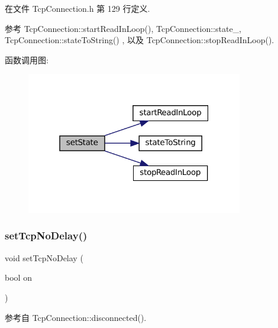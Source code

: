 在文件 Tcp\+Connection.\+h 第 129 行定义.



参考 Tcp\+Connection\+::start\+Read\+In\+Loop(), Tcp\+Connection\+::state\+\_\+, Tcp\+Connection\+::state\+To\+String() , 以及 Tcp\+Connection\+::stop\+Read\+In\+Loop().

函数调用图\+:
\nopagebreak
\begin{figure}[H]
\begin{center}
\leavevmode
\includegraphics[width=268pt]{classmuduo_1_1net_1_1TcpConnection_a5cefef7ea6272b740592d9dfecbd6c20_cgraph}
\end{center}
\end{figure}
\mbox{\label{classmuduo_1_1net_1_1TcpConnection_a7419d5072b837a2ba3cc5aac85015212}} 
\subsubsection{\texorpdfstring{set\+Tcp\+No\+Delay()}{setTcpNoDelay()}}
{\footnotesize\ttfamily void set\+Tcp\+No\+Delay (\begin{DoxyParamCaption}\item[{bool}]{on }\end{DoxyParamCaption})}



参考自 Tcp\+Connection\+::disconnected().

